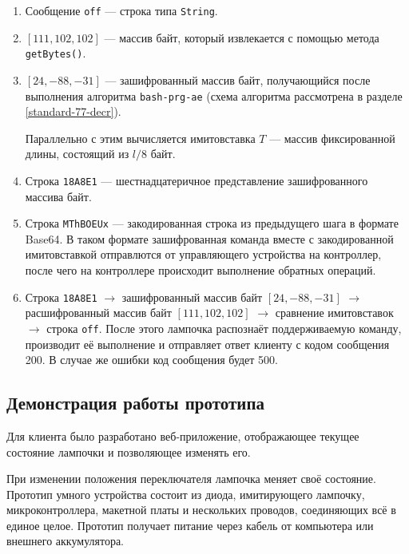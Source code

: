 	\begin{enumerate}
		\item Сообщение \texttt{off} --- строка типа \texttt{String}.
		\item $\left[111, 102, 102\right]$ --- массив байт, который извлекается с помощью метода \texttt{getBytes()}.
		\item $\left[24, -88, -31\right]$ --- зашифрованный массив байт, получающийся после выполнения
		алгоритма \texttt{bash-prg-ae} (схема алгоритма рассмотрена в разделе \ref{standard-77-decr}).
		
		\small{Параллельно с этим вычисляется имитовставка $T$ --- массив фиксированной длины, состоящий из $l / 8$ байт.}
		\normalsize
		
		\item Строка \texttt{18A8E1} --- шестнадцатеричное представление зашифрованного массива байт.
		\item Строка \texttt{MThBOEUx} --- закодированная строка из предыдущего шага в формате Base64.
		В таком формате зашифрованная команда вместе с закодированной имитовставкой отправлются от управляющего
		устройства на контроллер, после чего на контроллере происходит выполнение обратных операций.
		\item Строка \texttt{18A8E1} $\rightarrow$ зашифрованный массив байт $\left[24, -88, -31\right]$
		$\rightarrow$ расшифрованный массив байт $\left[111, 102, 102\right]$ $\rightarrow$ сравнение 
		имитовставок $\rightarrow$ строка \texttt{off}. После этого лампочка распознаёт поддерживаемую
		команду, производит её выполнение и отправляет ответ клиенту с кодом сообщения 200.
		В случае же ошибки код сообщения будет 500.
	\end{enumerate}
	
	\subsection{Демонстрация работы прототипа}
	
	Для клиента было разработано веб-приложение, отображающее текущее состояние лампочки и позволяющее
	изменять его.

	При изменении положения переключателя лампочка меняет своё состояние. Прототип умного устройства
	состоит из диода, имитирующего лампочку, микроконтроллера, макетной платы и нескольких проводов,
	соединяющих всё в единое целое. Прототип получает питание через кабель от компьютера или внешнего
	аккумулятора.
	
